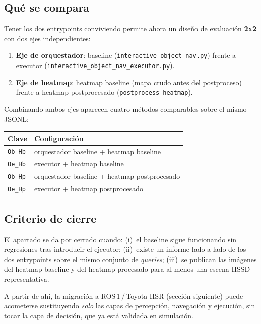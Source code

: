 \documentclass[11pt,a4paper]{article}
\begin{document}
\subsection*{Qué se compara}

Tener los dos entrypoints conviviendo permite ahora un diseño de evaluación
\textbf{2x2} con dos ejes independientes:

\begin{enumerate}
  \item \textbf{Eje de orquestador}: baseline
        (\texttt{interactive\_object\_nav.py}) frente a executor
        (\texttt{interactive\_object\_nav\_executor.py}).
  \item \textbf{Eje de heatmap}: heatmap baseline
        (mapa crudo antes del postproceso) frente a heatmap postprocesado
        (\texttt{postprocess\_heatmap}).
\end{enumerate}

Combinando ambos ejes aparecen cuatro métodos comparables sobre el mismo JSONL:
\begin{center}
\begin{tabular}{ll}
\toprule
\textbf{Clave} & \textbf{Configuración} \\
\midrule
\texttt{Ob\_Hb} & orquestador baseline + heatmap baseline \\
\texttt{Oe\_Hb} & executor + heatmap baseline \\
\texttt{Ob\_Hp} & orquestador baseline + heatmap postprocesado \\
\texttt{Oe\_Hp} & executor + heatmap postprocesado \\
\bottomrule
\end{tabular}
\end{center}

\subsection*{Criterio de cierre}

El apartado se da por cerrado cuando:
(i)~el baseline sigue funcionando sin regresiones tras introducir el
ejecutor;
(ii)~existe un informe lado a lado de los dos entrypoints sobre el mismo
conjunto de \emph{queries};
(iii)~se publican las imágenes del heatmap baseline y del heatmap
procesado para al menos una escena HSSD representativa.

A partir de ahí, la migración a ROS\,1\,/\,Toyota HSR (sección
siguiente) puede acometerse sustituyendo \emph{solo} las capas de
percepción, navegación y ejecución, sin tocar la capa de decisión, que
ya está validada en simulación.
\end{document}
